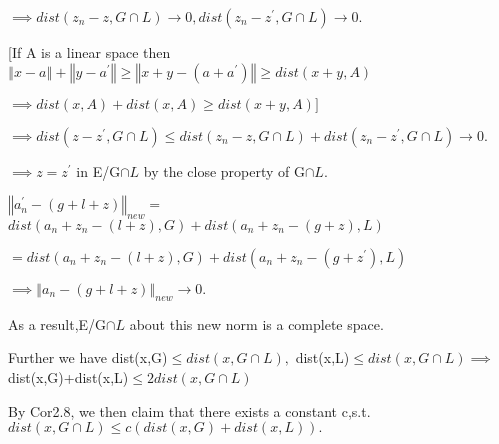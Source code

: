 \documentclass{article}
\begin{document}
$\implies dist\left( z_{n}-z,G\cap L\right) \rightarrow 0,dist\left(
z_{n}-z^{\prime },G\cap L\right) \rightarrow 0.$ 

[If A is a linear space then $\left\Vert x-a\right\Vert +\left\Vert
y-a^{\prime }\right\Vert \geq \left\Vert x+y-\left( a+a^{\prime }\right)
\right\Vert \geq dist\left( x+y,A\right) $

$\implies dist\left( x,A\right) +dist\left( x,A\right) \geq dist\left(
x+y,A\right) ]$

$\implies dist\left( z-z^{\prime },G\cap L\right) \leq dist\left(
z_{n}-z,G\cap L\right) +dist\left( z_{n}-z^{\prime },G\cap L\right)
\rightarrow 0.$

$\implies z=z^{\prime }$ in E/G$\cap L$ by the close property of G$\cap L.$

$\left\Vert a_{n}^{\prime }-\left( g+l+z\right) \right\Vert _{new}=$ $%
dist\left( a_{n}+z_{n}-\left( l+z\right) ,G\right) +dist\left(
a_{n}+z_{n}-\left( g+z\right) ,L\right) $

$=dist\left( a_{n}+z_{n}-\left( l+z\right) ,G\right) +dist\left(
a_{n}+z_{n}-\left( g+z^{\prime }\right) ,L\right) $

$\implies \left\Vert a_{n}-\left( g+l+z\right) \right\Vert _{new}\rightarrow
0.$

As a result,E/G$\cap L$ about this new norm is a complete space.

Further we have \bigskip dist(x,G)$\leq dist\left( x,G\cap L\right) ,$%
dist(x,L)$\leq dist\left( x,G\cap L\right) \implies $dist(x,G)+dist(x,L)$%
\leq 2dist\left( x,G\cap L\right) $

By Cor2.8, we then claim that there exists a constant c,s.t. $dist\left(
x,G\cap L\right) \leq c\left( dist(x,G)+dist(x,L)\right) .$

\bigskip 
\end{document}
